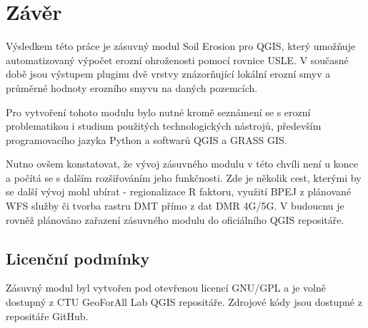 \chapter{Závěr}


Výsledkem této práce je zásuvný modul Soil Erosion pro QGIS, který
umožňuje automatizovaný výpočet erozní ohroženosti pomocí rovnice
USLE. V současné době jsou výstupem pluginu dvě vrstvy znázorňující
lokální erozní smyv a průměrné hodnoty erozního smyvu na daných
pozemcích.

Pro vytvoření tohoto modulu bylo nutné kromě seznámení se s erozní
problematikou i studium použitých technologických nástrojů, především
programovacího jazyka Python a softwarů QGIS a GRASS GIS.

Nutno ovšem konstatovat, že vývoj zásuvného modulu v této chvíli není
u konce a počítá se s dalším rozšiřováním jeho funkčnosti. Zde je
několik cest, kterými by se další vývoj mohl ubírat - regionalizace R
faktoru, využití BPEJ z plánované WFS služby či tvorba rastru DMT
přímo z dat DMR 4G/5G. V budoucnu je rovněž plánováno zařazení
zásuvného modulu do oficiálního QGIS repositáře.

\section{Licenční podmínky}

Zásuvný modul byl vytvořen pod otevřenou licencí GNU/GPL a je volně
dostupný z CTU GeoForAll Lab QGIS repositáře. Zdrojové kódy jsou dostupné
z repositáře GitHub\cite{mujgithub}.

